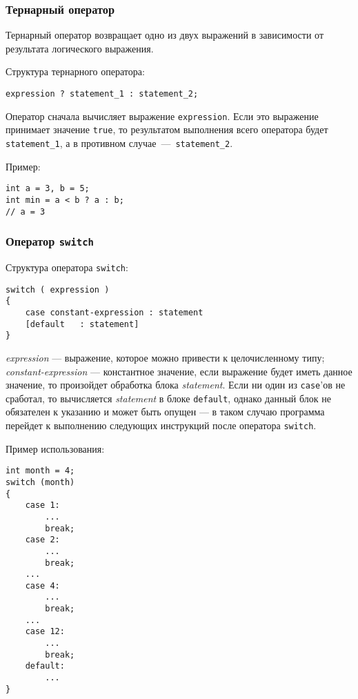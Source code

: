 \subsubsection{Тернарный оператор}
\label{subsubsec:ternaryOperator}
Тернарный оператор возвращает одно из двух выражений в зависимости от результата логического выражения.

Структура тернарного оператора:

\begin{lstlisting}
expression ? statement_1 : statement_2;
\end{lstlisting}

Оператор сначала вычисляет выражение \lstinline{expression}.
Если это выражение принимает значение \lstinline|true|,
то результатом выполнения всего оператора будет \lstinline|statement_1|, 
а в противном случае~---~\lstinline|statement_2|.

Пример:
\begin{lstlisting}
int a = 3, b = 5;
int min = a < b ? a : b;
// a = 3
\end{lstlisting}

\subsubsection{Оператор \texttt{switch}}
Структура оператора \lstinline|switch|:
\begin{lstlisting}
switch ( expression )
{
    case constant-expression : statement
    [default   : statement]
}
\end{lstlisting}

\textit{expression} --- выражение, которое можно привести к целочисленному типу; \textit{constant-expression} --- константное значение, если выражение будет иметь данное значение, то произойдет обработка блока \textit{statement}. Если ни один из \lstinline|case|'ов не сработал, то вычисляется \textit{statement} в блоке \lstinline|default|, однако данный блок не обязателен к указанию и может быть опущен --- в таком случаю программа перейдет к выполнению следующих инструкций после оператора \lstinline|switch|.

Пример использования:
\begin{lstlisting}
int month = 4;
switch (month)
{
    case 1:
        ...
        break;
    case 2:
        ...
        break;
    ...
    case 4:
        ...
        break;
    ...
    case 12:
        ...
        break;
    default:
        ...
}
\end{lstlisting}

